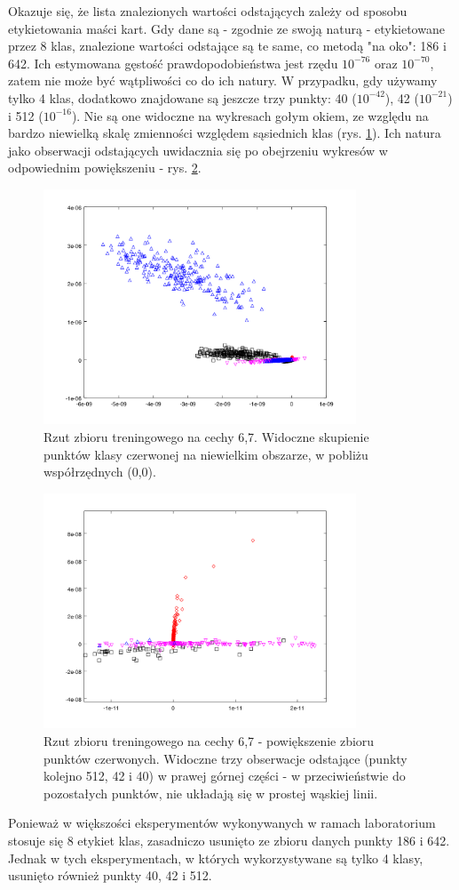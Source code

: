 \documentclass{article}
\begin{document}
	Okazuje się, że lista znalezionych wartości odstających zależy od sposobu etykietowania maści kart. Gdy dane są - zgodnie ze swoją naturą - etykietowane przez 8 klas, znalezione wartości odstające są te same, co metodą "na oko": 186 i 642. Ich estymowana gęstość prawdopodobieństwa jest rzędu $10^{-76}$ oraz $10^{-70}$, zatem nie może być wątpliwości co do ich natury. W przypadku, gdy używamy tylko 4 klas, dodatkowo znajdowane są jeszcze trzy punkty: 40 ($10^{-42}$), 42 ($10^{-21}$) i 512 ($10^{-16}$). Nie są one widoczne na wykresach gołym okiem, ze względu na bardzo niewielką skalę zmienności względem sąsiednich klas (rys. \ref{fig:train2-45-autoscale}). Ich natura jako obserwacji odstających uwidacznia się po obejrzeniu wykresów w odpowiednim powiększeniu - rys. \ref{fig:train2-45}. 
	\begin{figure} \centering 
		\includegraphics[height = 7cm]{plot-train2-67-autoscale.png}
		\caption{Rzut zbioru treningowego na cechy 6,7. Widoczne skupienie punktów klasy czerwonej na niewielkim obszarze, w pobliżu współrzędnych (0,0). }
		\label{fig:train2-45-autoscale}
	\end{figure}
    \begin{figure} \centering 
    	\includegraphics[height = 7cm]{plot-train2-67.png}
    	\caption{Rzut zbioru treningowego na cechy 6,7 - powiększenie zbioru punktów czerwonych. Widoczne trzy obserwacje odstające (punkty kolejno 512, 42 i 40) w prawej górnej części - w przeciwieństwie do pozostałych punktów, nie układają się w prostej wąskiej linii. }
    	\label{fig:train2-45}
    \end{figure}
	Ponieważ w większości eksperymentów wykonywanych w ramach laboratorium stosuje się 8 etykiet klas, zasadniczo usunięto ze zbioru danych punkty 186 i 642. Jednak w tych eksperymentach, w których wykorzystywane są tylko 4 klasy, usunięto również punkty 40, 42 i 512. 
	
\end{document}
